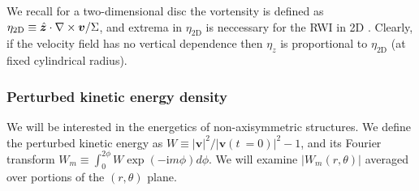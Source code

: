 We recall for a two-dimensional disc the vortensity is defined as 
$\eta_\mathrm{2D} \equiv \hat{\bm{z}}\cdot\nabla\times\bm{v}/\Sigma$, and
extrema in $\eta_\mathrm{2D}$ is neccessary for the RWI in
2D \citep{lovelace99,lin10}. Clearly, if the velocity field has no
vertical dependence then $\eta_z$ is proportional to
$\eta_\mathrm{2D}$ (at fixed cylindrical radius).   

\subsubsection{Perturbed kinetic energy density}  
We will be interested in the energetics of non-axisymmetric
structures. We define the perturbed kinetic energy as
$W\equiv|\bm{v}|^2/|\bm{v}(t~=0)|^2 - 1$, and its Fourier transform 
$W_m\equiv\int_0^{2\phi} W\exp{(-\mathrm{i}m\phi)}d\phi$. We will examine
$|W_m(r,\theta)|$ averaged over portions of the $(r,\theta)$
plane. %
